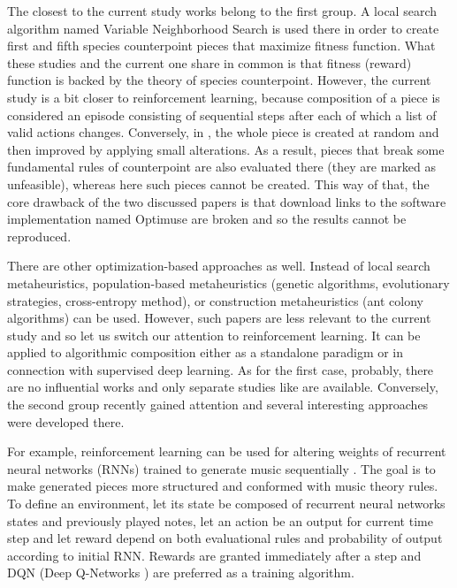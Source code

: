 \documentclass{article}
\begin{document}
The closest to the current study works \cite{herremans2012first, herremans2013fifth} belong to the first group. A local search algorithm named Variable Neighborhood Search is used there in order to create first and fifth species counterpoint pieces that maximize fitness function. What these studies and the current one share in common is that fitness (reward) function is backed by the theory of species counterpoint. However, the current study is a bit closer to reinforcement learning, because composition of a piece is considered an episode consisting of sequential steps after each of which a list of valid actions changes. Conversely, in \cite{herremans2012first, herremans2013fifth}, the whole piece is created at random and then improved by applying small alterations. As a result, pieces that break some fundamental rules of counterpoint are also evaluated there (they are marked as unfeasible), whereas here such pieces cannot be created. This way of that, the core drawback of the two discussed papers is that download links to the software implementation named Optimuse are broken and so the results cannot be reproduced.

There are other optimization-based approaches as well. Instead of local search metaheuristics, population-based metaheuristics (genetic algorithms, evolutionary strategies, cross-entropy method), or construction metaheuristics (ant colony algorithms) can be used. However, such papers are less relevant to the current study and so let us switch our attention to reinforcement learning. It can be applied to algorithmic composition either as a standalone paradigm or in connection with supervised deep learning. As for the first case, probably, there are no influential works and only separate studies like \cite{yi2007automatic, smith2012reinforcement} are available. Conversely, the second group recently gained attention and several interesting approaches were developed there.

For example, reinforcement learning can be used for altering weights of recurrent neural networks (RNNs) trained to generate music sequentially \cite{jaques2016generating, kotecha2018bach}. The goal is to make generated pieces more structured and conformed with music theory rules. To define an environment, let its state be composed of recurrent neural networks states and previously played notes, let an action be an output for current time step and let reward depend on both evaluational rules and probability of output according to initial RNN. Rewards are granted immediately after a step and DQN (Deep Q-Networks \cite{mnih2013playing}) are preferred as a training algorithm.
\end{document}
